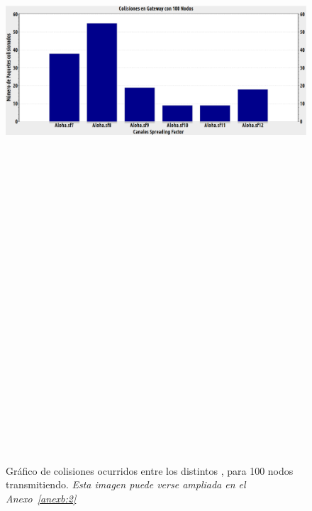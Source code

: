 \begin{justify}
\begin{figure}[!ht]
\centering
\includegraphics[width=13cm,height=30cm,keepaspectratio]{images/colisiones100nodos.eps}
\caption{Gráfico de colisiones ocurridos entre los distintos , para 100 nodos transmitiendo. \textit{Esta imagen puede verse ampliada en el Anexo~\ref{anexb:2}}}
\label{nodos:100}
\end{figure}

\end{justify}
